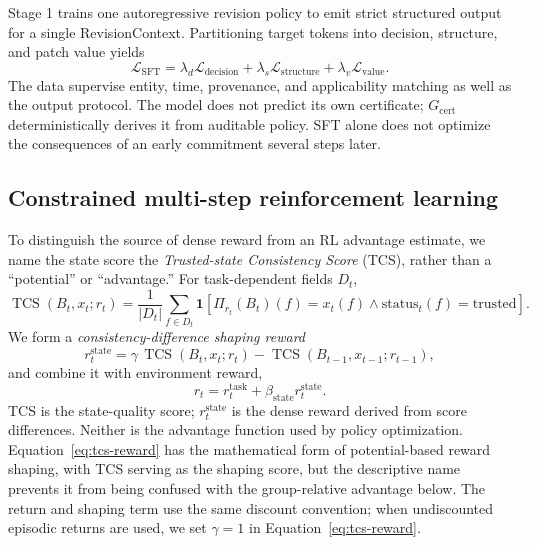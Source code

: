 \documentclass{article}
\newcommand{\tcs}{\operatorname{TCS}}
\begin{document}
Stage 1 trains one autoregressive revision policy to emit strict structured output for a single RevisionContext. Partitioning target tokens into decision, structure, and patch value yields
\begin{equation}
\mathcal L_{\mathrm{SFT}}=
\lambda_d\mathcal L_{\mathrm{decision}}+
\lambda_s\mathcal L_{\mathrm{structure}}+
\lambda_v\mathcal L_{\mathrm{value}}.
\end{equation}
The data supervise entity, time, provenance, and applicability matching as well as the output protocol. The model does not predict its own certificate; $G_{\mathrm{cert}}$ deterministically derives it from auditable policy. SFT alone does not optimize the consequences of an early commitment several steps later.

\subsection{Constrained multi-step reinforcement learning}

To distinguish the source of dense reward from an RL advantage estimate, we name the state score the \emph{Trusted-state Consistency Score} (TCS), rather than a ``potential'' or ``advantage.'' For task-dependent fields $D_t$,
\begin{equation}
\tcs(B_t,x_t;r_t)=\frac{1}{|D_t|}\sum_{f\in D_t}\mathbf{1}
\left[\Pi_{r_t}(B_t)(f)=x_t(f)\land\mathrm{status}_t(f)=\mathrm{trusted}\right].
\end{equation}
We form a \emph{consistency-difference shaping reward}
\begin{equation}
r_t^{\mathrm{state}}=\gamma\,\tcs(B_t,x_t;r_t)-\tcs(B_{t-1},x_{t-1};r_{t-1}),
\label{eq:tcs-reward}
\end{equation}
and combine it with environment reward,
\begin{equation}
r_t=r_t^{\mathrm{task}}+\beta_{\mathrm{state}}r_t^{\mathrm{state}}.
\end{equation}
TCS is the state-quality score; $r_t^{\mathrm{state}}$ is the dense reward derived from score differences. Neither is the advantage function used by policy optimization. Equation~\ref{eq:tcs-reward} has the mathematical form of potential-based reward shaping, with TCS serving as the shaping score, but the descriptive name prevents it from being confused with the group-relative advantage below. The return and shaping term use the same discount convention; when undiscounted episodic returns are used, we set $\gamma=1$ in Equation~\ref{eq:tcs-reward}.
\end{document}
